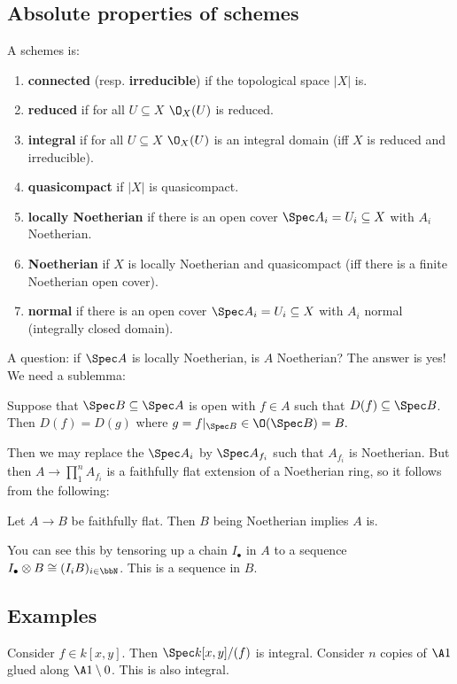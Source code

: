 \documentclass[12pt]{article}
\begin{document}
\subsection{Absolute properties of schemes}
\begin{defn}
	A schemes is:
	\begin{enumerate}
		\item \textbf{connected} (resp. \textbf{irreducible}) if the topological space $|X|$ is.
		\item \textbf{reduced} if for all $U\subseteq X$ $\O_X(U)$ is reduced.
		\item \textbf{integral} if for all $U\subseteq X$ $\O_X(U)$ is an integral domain (iff $X$ is reduced and irreducible).
		\item \textbf{quasicompact} if $|X|$ is quasicompact.
		\item \textbf{locally Noetherian} if there is an open cover $\Spec A_i=U_i\subseteq X$ with $A_i$ Noetherian.
		\item \textbf{Noetherian} if $X$ is locally Noetherian and quasicompact (iff there is a finite Noetherian open cover).
		\item \textbf{normal} if there is an open cover $\Spec A_i=U_i\subseteq X$ with $A_i$ normal (integrally closed domain).
	\end{enumerate}
\end{defn}

A question: if $\Spec A$ is locally Noetherian, is $A$ Noetherian? The answer is yes! We need a sublemma:
\begin{lem}
	Suppose that $\Spec B\subseteq \Spec A$ is open with $f\in A$ such that $D(f)\subseteq\Spec B$. Then $D(f)=D(g)$
	where $g=f|_{\Spec B}\in\O(\Spec B)=B.$
\end{lem}
Then we may replace the $\Spec A_i$ by $\Spec A_{f_i}$ such that $A_{f_i}$ is Noetherian. But then $A\to \prod_1^n A_{f_i}$ is a faithfully flat 
extension of a Noetherian ring, so it follows from the following:
\begin{lem}
	Let $A\to B$ be faithfully flat. Then $B$ being Noetherian implies $A$ is.
\end{lem}
You can see this by tensoring up a chain $I_\bullet$ in $A$ to a sequence $I_\bullet\otimes B\cong (I_iB)_{i\in\bbN}$. This is a sequence in $B$.

\subsection{Examples}
Consider $f\in k[x,y]$. Then $\Spec k[x,y]/(f)$ is integral.
Consider $n$ copies of $\A1$ glued along $\A1\setminus 0$. This is also integral.
\end{document}
